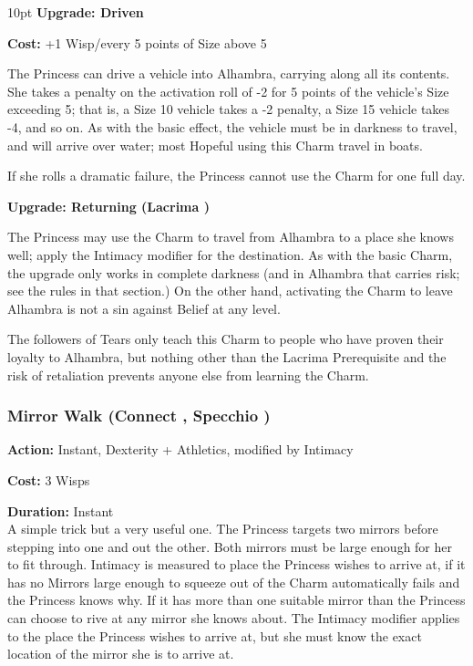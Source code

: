 \begin{myindentpar}{10pt} \textbf{Upgrade: Driven}

\noindent \textbf{Cost:} +1 Wisp/every 5 points of Size above 5

The Princess can drive a vehicle into Alhambra, carrying along all its contents. She takes a penalty on the activation roll of -2 for 5 points of the vehicle's Size exceeding 5; that is, a Size 10 vehicle takes a -2 penalty, a Size 15 vehicle takes -4, and so on. As with the basic effect, the vehicle must be in darkness to travel, and will arrive over water; most Hopeful using this Charm travel in boats.

If she rolls a dramatic failure, the Princess cannot use the Charm for one full day.

\textbf{Upgrade: Returning (Lacrima \textbullet\textbullet\textbullet)}

The Princess may use the Charm to travel from Alhambra to a place she knows well; apply the Intimacy modifier for the destination. As with the basic Charm, the upgrade only works in complete darkness (and in Alhambra that carries risk; see the rules in that section.) On the other hand, activating the Charm to leave Alhambra is not a sin against Belief at any level.

The followers of Tears only teach this Charm to people who have proven their loyalty to Alhambra, but nothing other than the Lacrima Prerequisite and the risk of retaliation prevents anyone else from learning the Charm.\end{myindentpar}

\subsubsection*{Mirror Walk (Connect \textbullet\textbullet\textbullet\textbullet, Specchio \textbullet\textbullet)}

\noindent \textbf{Action:} Instant, Dexterity + Athletics, modified by Intimacy

\noindent \textbf{Cost:} 3 Wisps

\noindent \textbf{Duration:} Instant \\

A simple trick but a very useful one. The Princess targets two mirrors before stepping into one and out the other. Both mirrors must be large enough for her to fit through. Intimacy is measured to place the Princess wishes to arrive at, if it has no Mirrors large enough to squeeze out of the Charm automatically fails and the Princess knows why. If it has more than one suitable mirror than the Princess can choose to rive at any mirror she knows about. The Intimacy modifier applies to the place the Princess wishes to arrive at, but she must know the exact location of the mirror she is to arrive at. 

